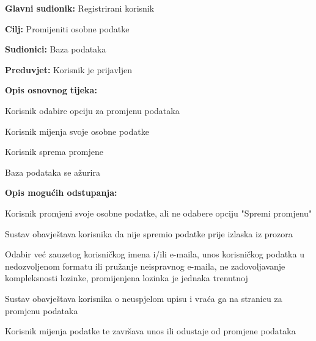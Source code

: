 					\noindent {}
					\begin{packed_item}
	
						\item \textbf{Glavni sudionik: } Registrirani korisnik
						\item  \textbf{Cilj:} Promijeniti osobne podatke
						\item  \textbf{Sudionici:} Baza podataka
						\item  \textbf{Preduvjet:} Korisnik je prijavljen
						\item  \textbf{Opis osnovnog tijeka:}
						
						\item[] \begin{packed_enum}
	
							\item Korisnik odabire opciju za promjenu podataka
							\item Korisnik mijenja svoje osobne podatke
							\item Korisnik sprema promjene
							\item Baza podataka se ažurira

						\end{packed_enum}
						
						\item  \textbf{Opis mogućih odstupanja:}
						
						\item[] \begin{packed_item}
	
							\item[2.a] Korisnik promjeni svoje osobne podatke, ali ne odabere opciju "Spremi promjenu"
							\item[] \begin{packed_enum}
								
								\item Sustav obavještava korisnika da nije spremio podatke prije izlaska iz prozora

							\end{packed_enum}
							\item[2.b] Odabir već zauzetog korisničkog imena i/ili e-maila, unos korisničkog podatka u nedozvoljenom formatu ili pružanje neispravnog e-maila, ne zadovoljavanje kompleksnosti lozinke, promijenjena lozinka je jednaka trenutnoj
							\item[] \begin{packed_enum}
								
								\item Sustav obavještava korisnika o neuspjelom upisu i vraća ga na stranicu za promjenu podataka
								\item Korisnik mijenja podatke te završava unos ili odustaje od promjene podataka
								
							\end{packed_enum}
							
							
						\end{packed_item}
					\end{packed_item}
					

